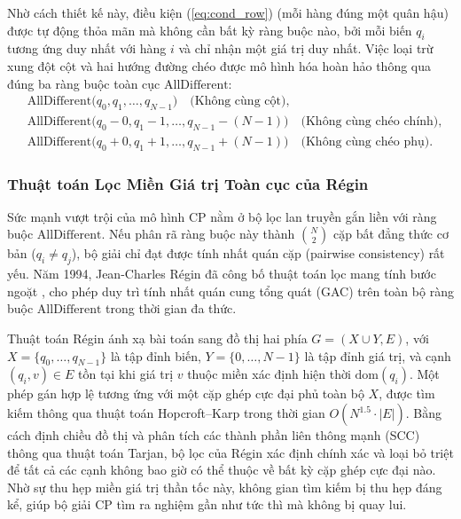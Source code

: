 \documentclass[a4paper,fleqn]{cas-sc}
\begin{document}
Nhờ cách thiết kế này, điều kiện (\ref{eq:cond_row}) (mỗi hàng đúng một quân hậu) được tự động thỏa mãn mà không cần bất kỳ ràng buộc nào, bởi mỗi biến $q_i$ tương ứng duy nhất với hàng $i$ và chỉ nhận một giá trị duy nhất. Việc loại trừ xung đột cột và hai hướng đường chéo được mô hình hóa hoàn hảo thông qua đúng ba ràng buộc toàn cục $\text{AllDifferent}$:
\begin{align}
    &\text{AllDifferent}\big(q_0, q_1, \dots, q_{N-1}\big) \quad \text{(Không cùng cột)}, \label{eq:cp_col}\\
    &\text{AllDifferent}\big(q_0 - 0, q_1 - 1, \dots, q_{N-1} - (N-1)\big) \quad \text{(Không cùng chéo chính)}, \label{eq:cp_diag}\\
    &\text{AllDifferent}\big(q_0 + 0, q_1 + 1, \dots, q_{N-1} + (N-1)\big) \quad \text{(Không cùng chéo phụ)}. \label{eq:cp_antidiag}
\end{align}

\subsubsection{Thuật toán Lọc Miền Giá trị Toàn cục của Régin}
Sức mạnh vượt trội của mô hình CP nằm ở bộ lọc lan truyền gắn liền với ràng buộc $\text{AllDifferent}$. Nếu phân rã ràng buộc này thành $\binom{N}{2}$ cặp bất đẳng thức cơ bản ($q_i \neq q_j$), bộ giải chỉ đạt được tính nhất quán cặp (pairwise consistency) rất yếu. Năm 1994, Jean-Charles Régin đã công bố thuật toán lọc mang tính bước ngoặt \cite{regin1994filtering}, cho phép duy trì tính nhất quán cung tổng quát (GAC) trên toàn bộ ràng buộc $\text{AllDifferent}$ trong thời gian đa thức.

Thuật toán Régin ánh xạ bài toán sang đồ thị hai phía $G = (X \cup Y, E)$, với $X = \{q_0, \dots, q_{N-1}\}$ là tập đỉnh biến, $Y = \{0, \dots, N-1\}$ là tập đỉnh giá trị, và cạnh $(q_i, v) \in E$ tồn tại khi giá trị $v$ thuộc miền xác định hiện thời $\text{dom}(q_i)$. Một phép gán hợp lệ tương ứng với một cặp ghép cực đại phủ toàn bộ $X$, được tìm kiếm thông qua thuật toán Hopcroft--Karp trong thời gian $O(N^{1.5} \cdot |E|)$. Bằng cách định chiều đồ thị và phân tích các thành phần liên thông mạnh (SCC) thông qua thuật toán Tarjan, bộ lọc của Régin xác định chính xác và loại bỏ triệt để tất cả các cạnh không bao giờ có thể thuộc về bất kỳ cặp ghép cực đại nào. Nhờ sự thu hẹp miền giá trị thần tốc này, không gian tìm kiếm bị thu hẹp đáng kể, giúp bộ giải CP tìm ra nghiệm gần như tức thì mà không bị quay lui.
\end{document}
